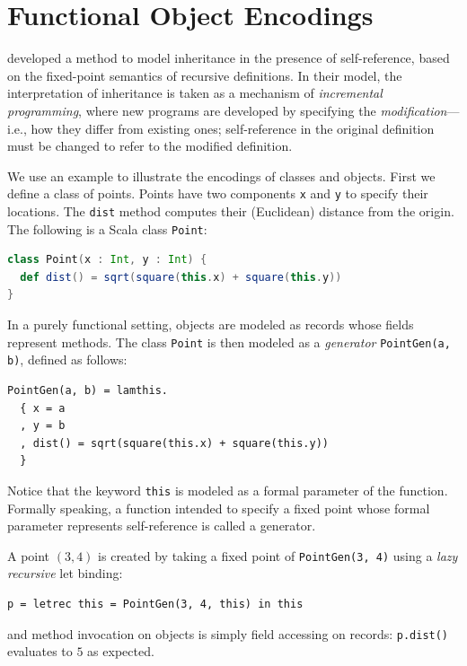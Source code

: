 \section{Functional Object Encodings}

\label{sec:bg:object}

\citet{cook1989denotational} developed a method to model inheritance in the
presence of self-reference, based on the fixed-point semantics of recursive
definitions. In their model, the interpretation of inheritance is taken as a
mechanism of \textit{incremental programming}, where new programs are developed
by specifying the \textit{modification}---i.e., how they differ from existing
ones; self-reference in the original definition must be changed to refer to the
modified definition.

We use an example to illustrate the encodings of classes and objects. First we
define a class of points. Points have two components \lstinline{x} and
\lstinline{y} to specify their locations. The \lstinline{dist} method computes
their (Euclidean) distance from the origin. The following is a Scala class
\lstinline{Point}:
\begin{lstlisting}[language=Scala]
class Point(x : Int, y : Int) {
  def dist() = sqrt(square(this.x) + square(this.y))
}
\end{lstlisting}

In a purely functional setting, objects are modeled as records whose fields
represent methods. The class \lstinline{Point} is then modeled as a
\textit{generator} \lstinline{PointGen(a, b)}, defined as follows:
\begin{lstlisting}[language=simple]
PointGen(a, b) = lamthis.
  { x = a
  , y = b
  , dist() = sqrt(square(this.x) + square(this.y))
  }
\end{lstlisting}
Notice that the keyword \lstinline{this} is modeled as a formal parameter of the
function. %
Formally speaking, a function intended to specify a fixed point whose formal
parameter represents self-reference is called a generator.

A point $(3, 4)$ is created by taking a fixed point of \lstinline{PointGen(3, 4)} using a
\textit{lazy recursive} let binding:
\begin{lstlisting}[language=simple]
p = letrec this = PointGen(3, 4, this) in this
\end{lstlisting}
and method invocation on objects is simply field accessing on records:
\lstinline{p.dist()} evaluates to $5$ as expected.


